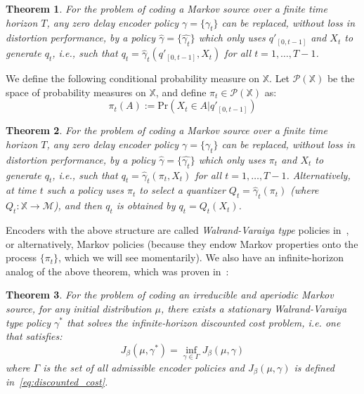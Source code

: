 \documentclass[conference]{IEEEtran}
\newtheorem{theorem}{Theorem}[section]
\begin{document}
\begin{theorem}\cite{Witsenhausen}
    For the problem of coding a Markov source over a finite time horizon \(T\), any zero delay encoder policy \(\gamma=\{\gamma_t\}\) can be replaced, without loss in distortion performance, by a policy \(\hat{\gamma}=\{\hat{\gamma_t}\}\) which only uses \(q'_{[0,t-1]}\) and \(X_t\) to generate \(q_t\), i.e., such that \(q_t = \hat{\gamma}_t(q'_{[0,t-1]}, X_t) \) for all \( t = 1,\ldots,T-1\).
\end{theorem}

We define the following conditional probability measure on \(\mathbb{X}\). Let \(\mathcal{P}(\mathbb{X})\) be the space of probability measures on \(\mathbb{X}\), and define \(\pi_t \in \mathcal{P}(\mathbb{X})\) as:
\[\pi_t(A) := \text{Pr}(X_t \in A | q'_{[0,t-1]})\]
\begin{theorem}\label{theorem:Walrand}\cite{Walrand}
    For the problem of coding a Markov source over a finite time horizon \(T\), any zero delay encoder policy \(\gamma=\{\gamma_t\}\) can be replaced, without loss in distortion performance, by a policy \(\hat{\gamma}=\{\hat{\gamma_t}\}\) which only uses \(\pi_t\) and \(X_t\) to generate \(q_t\), i.e., such that \(q_t = \hat{\gamma}_t(\pi_t, X_t) \) for all \( t = 1,\ldots,T-1\). Alternatively, at time \(t\) such a policy uses \(\pi_t\) to select a quantizer \(Q_t = \hat{\gamma}_t(\pi_t)\) (where \(Q_t : \mathbb{X} \to \mathcal{M}\)), and then \(q_t\) is obtained by \(q_t = Q_t(X_t)\).
\end{theorem}

Encoders with the above structure are called \emph{Walrand-Varaiya type} policies in~\cite{Linder,Wood}, or alternatively, Markov policies (because they endow Markov properties onto the process \( \{ \pi_t \} \), which we will see momentarily). We also have an infinite-horizon analog of the above theorem, which was proven in~\cite{Wood}:

\begin{theorem}\label{theorem:Wood}\cite[Theorem 7]{Wood}
    For the problem of coding an irreducible and aperiodic Markov source, for any initial distribution \( \mu \), there exists a stationary Walrand-Varaiya type policy \(\gamma^*\) that solves the infinite-horizon discounted cost problem, i.e. one that satisfies:
    \[J_\beta(\mu,\gamma^*) = \inf_{\gamma \in \Gamma}J_\beta(\mu,\gamma)\]
    where \( \Gamma \) is the set of all admissible encoder policies and \(J_\beta(\mu,\gamma)\) is defined in~\eqref{eq:discounted_cost}.
\end{theorem}
\end{document}
